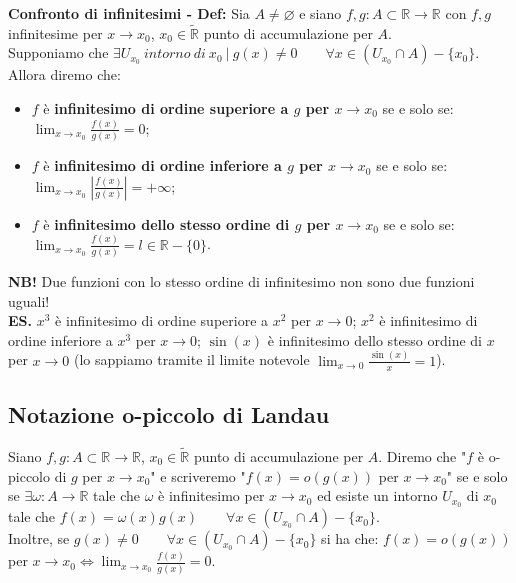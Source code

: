 \documentclass{article}
\begin{document}
\noindent\textbf{Confronto di infinitesimi - Def:} Sia $A \neq \varnothing$ e siano $f, g: A \subset \mathbb{R} \xrightarrow{} \mathbb{R}$ con $f, g$ infinitesime per $x \to x_0$, $x_0 \in \widetilde{\mathbb{R}}$ punto di accumulazione per $A$.\\
Supponiamo che $\exists U_{x_0} \ intorno \ di \ x_0 \ | \ g(x) \neq 0 \qquad \forall x \in (U_{x_0} \cap A) - \{x_0\}$. Allora diremo che:
\begin{itemize}
    \item $f$ è \textbf{infinitesimo di ordine superiore a $g$ per $x \to x_0$} se e solo se: $\lim_{x \to x_0} \frac{f(x)}{g(x)} = 0$;
    \item $f$ è \textbf{infinitesimo di ordine inferiore a $g$ per $x \to x_0$} se e solo se: $\lim_{x \to x_0} \left|\frac{f(x)}{g(x)}\right| = +\infty$;
    \item $f$ è \textbf{infinitesimo dello stesso ordine di $g$ per $x \to x_0$} se e solo se: $\lim_{x \to x_0} \frac{f(x)}{g(x)} = l \in \mathbb{R} - \{0\}$.
\end{itemize}

\noindent\textbf{NB!} Due funzioni con lo stesso ordine di infinitesimo non sono due funzioni uguali!\\

\noindent\textbf{ES.} $x^3$ è infinitesimo di ordine superiore a $x^2$ per $x \to 0$; $x^2$ è infinitesimo di ordine inferiore a $x^3$ per $x \to 0$; $\sin(x)$ è infinitesimo dello stesso ordine di $x$ per $x \to 0$ (lo sappiamo tramite il limite notevole $\lim_{x \to 0} \frac{\sin(x)}{x} = 1$).

\subsection{Notazione o-piccolo di Landau}
Siano $f, g: A \subset \mathbb{R} \xrightarrow{} \mathbb{R}$, $x_0 \in \widetilde{\mathbb{R}}$ punto di accumulazione per $A$. Diremo che "$f$ è o-piccolo di $g$ per $x \to x_0$" e scriveremo "$f(x) = o(g(x))$ per $x \to x_0$" se e solo se $\exists \omega: A \xrightarrow{} \mathbb{R}$ tale che $\omega$ è infinitesimo per $x \to x_0$ ed esiste un intorno $U_{x_0}$ di $x_0$ tale che $f(x) = \omega(x)g(x) \qquad \forall x \in (U_{x_0} \cap A) - \{x_0\}$.\\
Inoltre, se $g(x) \neq 0 \qquad \forall x \in (U_{x_0} \cap A) - \{x_0\}$ si ha che: $f(x) = o(g(x))$ per $x \to x_0 \iff \lim_{x \to x_0} \frac{f(x)}{g(x)} = 0$.\\
\end{document}
